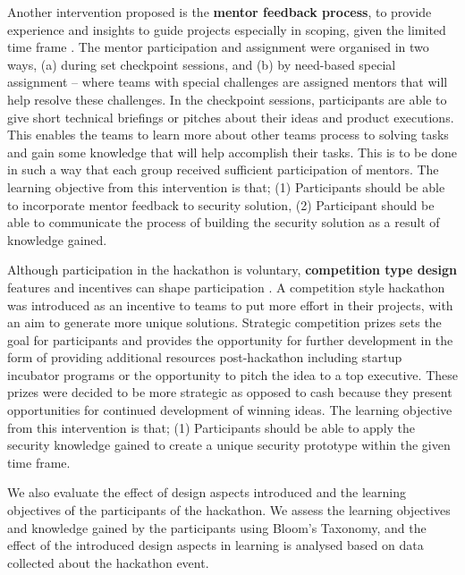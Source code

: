 \documentclass[runningheads]{llncs}
\begin{document}
Another intervention proposed is the \textbf{mentor feedback process}, to provide experience and insights to guide projects especially in scoping, given the limited time frame \cite{lara2016hackathons}. The mentor participation and assignment were organised in two ways, (a) during set checkpoint sessions, and (b) by need-based special assignment -- where teams with special challenges are assigned mentors that will help resolve these challenges. In the checkpoint sessions, participants are able to give short technical briefings or pitches about their ideas and product executions. This enables the teams to learn more about other teams process to solving tasks and gain some knowledge that will help accomplish their tasks. This is to be done in such a way that each group received sufficient participation of mentors. The learning objective from this intervention is that; (1) Participants should be able to incorporate mentor feedback to security solution, (2) Participant should be able to communicate the process of building the security solution as a result of knowledge gained.

Although participation in the hackathon is voluntary, \textbf{competition type design} features and incentives can shape participation \cite{grimes2008robotics}. A competition style hackathon was introduced as an incentive to teams to put more effort in their projects, with an aim to generate more unique solutions. Strategic competition prizes sets the goal for participants and provides the opportunity for further development in the form of providing additional resources post-hackathon including  startup incubator programs or the opportunity to pitch the idea to a top executive. These prizes were decided to be more strategic as opposed to cash because they present opportunities for continued development of winning ideas. The learning objective from this intervention is that; (1) Participants should be able to apply the security knowledge gained to create a unique security prototype within the given time frame.

We also evaluate the effect of design aspects introduced and the learning objectives of the participants of the hackathon. We assess the learning objectives and knowledge gained by the participants using Bloom's Taxonomy, and the effect of the introduced design aspects in learning is analysed based on data collected about the hackathon event.
\end{document}
